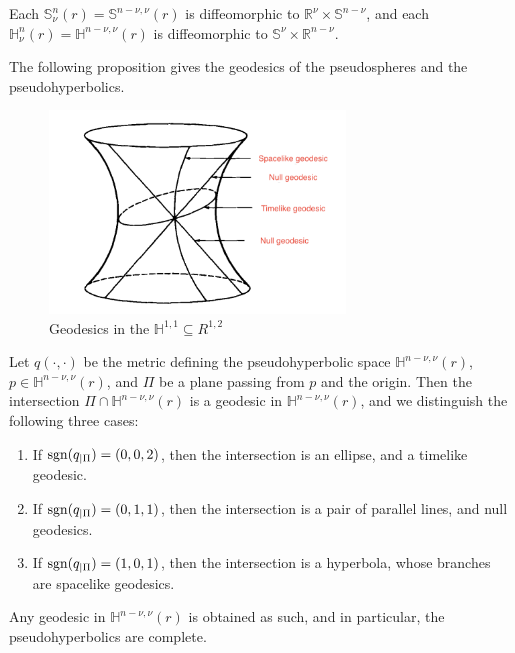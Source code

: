 \documentclass{report}
\begin{document}
\begin{proposition}
    Each $\mathbb S^n_\nu(r) = \mathbb S^{n - \nu, \nu}(r)$ is diffeomorphic to $\mathbb R^{\nu} \times \mathbb S^{n-\nu}$, and each $\mathbb H^n_\nu(r) = \mathbb H^{n - \nu, \nu}(r)$ is diffeomorphic to $\mathbb S^{\nu} \times \mathbb R^{n -\nu}$. 
\end{proposition}
The following proposition gives the geodesics of the pseudospheres and the pseudohyperbolics.
\begin{figure}[ht]
    \centering
    \includegraphics[width=0.7\textwidth]{Pseudospheres/geodesiques.png}
    \caption{Geodesics in the $\mathbb H^{1,1} \subseteq R^{1,2}$}
    \label{fig:geodesics_hyperbolic_plane}
\end{figure}
\begin{proposition}
    Let $q(\cdot, \cdot)$ be the metric defining the pseudohyperbolic space $\mathbb H^{n - \nu, \nu}(r)$,  $p \in \mathbb H^{n- \nu, \nu}(r)$, and $\Pi$ be a plane passing from $p$ and the origin.
    Then the intersection $\Pi \cap \mathbb H^{n - \nu, \nu}(r)$ is a geodesic in $\mathbb H^{n - \nu, \nu}(r)$, and we distinguish the following three cases:
    \begin{enumerate}[label=(\roman*)]
        \item If $\operatorname{sgn}(q_{|\Pi}) = (0,0,2)$, then the intersection is an ellipse, and a timelike geodesic.
        \item If $\operatorname{sgn}(q_{|\Pi}) = (0,1,1)$, then the intersection is a pair of parallel lines, and null geodesics.
        \item If $\operatorname{sgn}(q_{|\Pi}) = (1, 0, 1)$, then the intersection is a hyperbola, whose branches are spacelike geodesics.
    \end{enumerate}
    Any geodesic in $\mathbb H^{n - \nu, \nu}(r)$ is obtained as such, and in particular, the pseudohyperbolics are complete.
\end{proposition}
\end{document}
